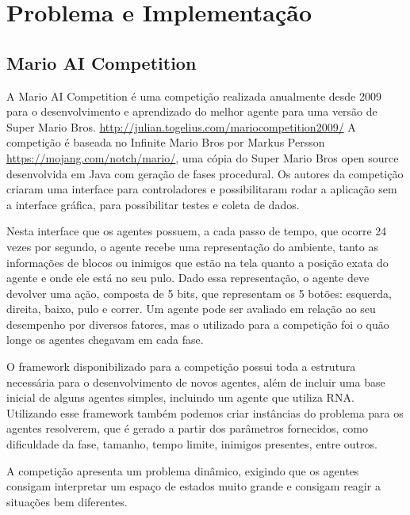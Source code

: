 \documentclass[a4paper,12pt]{article}
\begin{document}
  
  \section{Problema e Implementação}
      
    \subsection{Mario AI Competition}
    
      A Mario AI Competition é uma competição realizada anualmente desde 2009 para o 
      desenvolvimento e aprendizado do melhor agente para uma versão de Super Mario Bros. 
      \url{http://julian.togelius.com/mariocompetition2009/}
      A competição é baseada no Infinite Mario Bros por Markus Persson 
      \url{https://mojang.com/notch/mario/}, uma cópia do Super Mario Bros open source 
      desenvolvida em Java com geração de fases procedural. Os autores da competição criaram 
      uma interface para controladores e possibilitaram rodar a aplicação sem a interface 
      gráfica, para possibilitar testes e coleta de dados.
    
      Nesta interface que os agentes possuem, a cada passo de tempo, que ocorre 24 vezes 
      por segundo, o agente recebe uma representação do ambiente, tanto as informações de 
      blocos ou inimigos que estão na tela quanto a posição exata do agente e onde ele está 
      no seu pulo. Dado essa representação, o agente deve devolver uma ação, composta de 5 
      bits, que representam os 5 botões: esquerda, direita, baixo, pulo e correr.
      Um agente pode ser avaliado em relação ao seu desempenho por diversos fatores, mas o 
      utilizado para a competição foi o quão longe os agentes chegavam em cada fase.
      
      O framework disponibilizado para a competição possui toda a estrutura necessária para 
      o desenvolvimento de novos agentes, além de incluir uma base inicial de alguns agentes 
      simples, incluindo um agente que utiliza RNA. Utilizando esse framework também podemos 
      criar instâncias do problema para os agentes resolverem, que é gerado a partir dos 
      parâmetros fornecidos, como dificuldade da fase, tamanho, tempo limite, inimigos 
      presentes, entre outros.
    
      A competição apresenta um problema dinâmico, exigindo que os agentes consigam 
      interpretar um espaço de estados muito grande e consigam reagir a situações bem diferentes.
      
\end{document}
